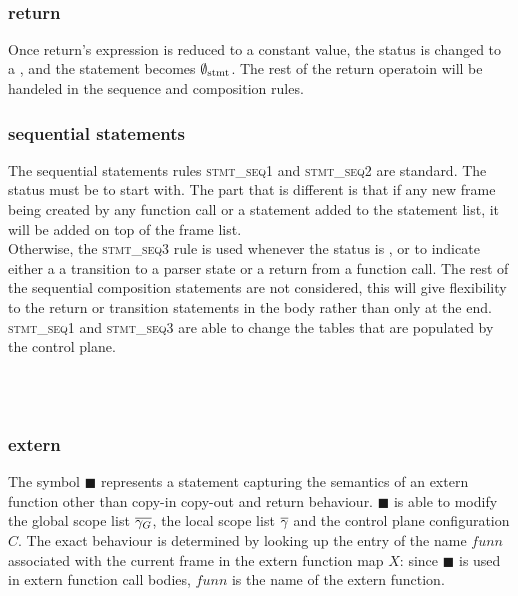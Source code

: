 \documentclass[UTF8]{article}
\begin{document}
\begin{figure}[ht!]
    \ottusedrule{\ottdrulestmtXXapplyXXtableXXe{}} \\
    \ottusedrule{\ottdrulestmtXXapplyXXtableXXv{}} 
\end{figure}

\subsubsection*{return}
Once return's expression is reduced to a constant value, the status is changed to a \returnst{} \cval, and the statement becomes $\emptyset_{ \mathrm{stmt} }{}$. The rest of the return operatoin will be handeled in the sequence and composition rules.

\begin{figure}[ht!]
    \ottusedrule{\ottdrulestmtXXretXXv{}} 
\end{figure}

\subsubsection*{sequential statements}
The sequential statements rules \textsc{stmt\_seq1} and \textsc{stmt\_seq2} are standard. The status \status{} must be \running{} to start with. The part that is different is that if any new frame being created by any function call or a statement added to the statement list, it will be added on top of the frame list. \\

Otherwise, the \textsc{stmt\_seq3}  rule is used whenever the status is \returnst{}, or \trans{} to indicate either a a transition to a parser state or a return from a function call. The rest of the sequential composition statements are not considered, this will give flexibility to the return or transition statements in the body rather than only at the end.
\textsc{stmt\_seq1} and \textsc{stmt\_seq3} are able to change the tables that are populated by the control plane.

\begin{figure}[h!]
    \ottusedrule{\ottdrulestmtXXseqOne{}} \\
    \ottusedrule{\ottdrulestmtXXseqTwo{}} \\
    \ottusedrule{\ottdrulestmtXXseqThree{}}
\end{figure}


\subsubsection*{extern}
The symbol $\blacksquare$ represents a statement capturing the semantics of an extern function other than copy-in copy-out and return behaviour. $\blacksquare$ is able to modify the global scope list $\overline{\gamma_G}$, the local scope list $\overline{\gamma}$ and the control plane configuration $C$. The exact behaviour is determined by looking up the entry of the name $\mathit{funn}$ associated with the current frame in the extern function map $X$: since $\blacksquare$ is used in extern function call bodies, $\mathit{funn}$ is the name of the extern function.
\end{document}
